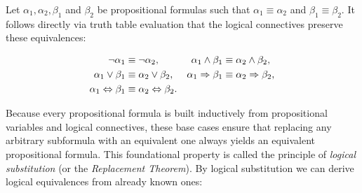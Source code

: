 Let $\alpha_1, \alpha_2, \beta_1$ and $\beta_2$ be propositional formulas such that $\alpha_1 \equiv \alpha_2$ and $\beta_1 \equiv \beta_2$. It follows directly via truth table evaluation that the logical connectives preserve these equivalences:

\begin{align}
    \lnot\alpha_1 &\equiv \lnot\alpha_2, & \alpha_1 \land \beta_1 &\equiv \alpha_2 \land \beta_2, \notag \\
    \alpha_1 \lor \beta_1 &\equiv \alpha_2 \lor \beta_2, & \alpha_1 \Rightarrow \beta_1 &\equiv \alpha_2 \Rightarrow \beta_2, \notag \\
    \alpha_1 \Leftrightarrow \beta_1 &\equiv \alpha_2 \Leftrightarrow \beta_2. \notag
\end{align}

Because every propositional formula is built inductively from propositional variables and logical connectives, these base cases ensure that replacing any arbitrary subformula with an equivalent one always yields an equivalent propositional formula. This foundational property is called the principle of \emph{logical substitution} (or the \emph{Replacement Theorem}). By logical substitution we can derive logical equivalences from already known ones:

